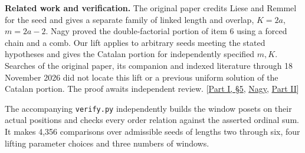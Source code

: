 \documentclass[11pt]{article}
\begin{document}
\small
\textbf{Related work and verification.} The original paper credits Liese and Remmel for the seed and gives a separate family of linked length and overlap, $K=2a$, $m=2a-2$. Nagy proved the double-factorial portion of item 6 using a forced chain and a comb. Our lift applies to arbitrary seeds meeting the stated hypotheses and gives the Catalan portion for independently specified $m,K$. Searches of the original paper, its companion and indexed literature through 18 November 2026 did not locate this lift or a previous uniform solution of the Catalan portion. The proof awaits independent review. [\href{https://arxiv.org/html/2610.29846v1\#S5}{Part I, \S5}, \href{https://arxiv.org/abs/2611.06937}{Nagy}, \href{https://arxiv.org/abs/2611.12829}{Part II}]

The accompanying \texttt{verify.py} independently builds the window posets on their actual positions and checks every order relation against the asserted ordinal sum. It makes 4,356 comparisons over admissible seeds of lengths two through six, four lifting parameter choices and three numbers of windows.
\end{document}
